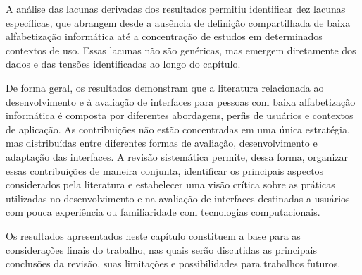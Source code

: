A análise das lacunas derivadas dos resultados permitiu identificar dez lacunas específicas, que abrangem desde a ausência de definição compartilhada de baixa alfabetização informática até a concentração de estudos em determinados contextos de uso. Essas lacunas não são genéricas, mas emergem diretamente dos dados e das tensões identificadas ao longo do capítulo.

De forma geral, os resultados demonstram que a literatura relacionada ao desenvolvimento e à avaliação de interfaces para pessoas com baixa alfabetização informática é composta por diferentes abordagens, perfis de usuários e contextos de aplicação. As contribuições não estão concentradas em uma única estratégia, mas distribuídas entre diferentes formas de avaliação, desenvolvimento e adaptação das interfaces. A revisão sistemática permite, dessa forma, organizar essas contribuições de maneira conjunta, identificar os principais aspectos considerados pela literatura e estabelecer uma visão crítica sobre as práticas utilizadas no desenvolvimento e na avaliação de interfaces destinadas a usuários com pouca experiência ou familiaridade com tecnologias computacionais.

Os resultados apresentados neste capítulo constituem a base para as considerações finais do trabalho, nas quais serão discutidas as principais conclusões da revisão, suas limitações e possibilidades para trabalhos futuros.